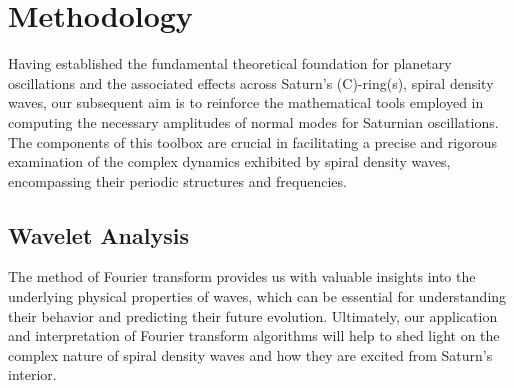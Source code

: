 \documentclass{article}
\begin{document}




\section{Methodology}
Having established the fundamental theoretical foundation for planetary oscillations and the associated effects across Saturn's (C)-ring(s), spiral density waves, our subsequent aim is to reinforce the mathematical tools employed in computing the necessary amplitudes of normal modes for Saturnian oscillations. The components of this toolbox are crucial in facilitating a precise and rigorous examination of the complex dynamics exhibited by spiral density waves, encompassing their periodic structures and frequencies.

\subsection{Wavelet Analysis}
 The method of Fourier transform provides us with valuable insights into the underlying physical properties of waves, which can be essential for understanding their behavior and predicting their future evolution. Ultimately, our application and interpretation of Fourier transform algorithms will help to shed light on the complex nature of spiral density waves and how they are excited from Saturn's interior.
 
\end{document}
